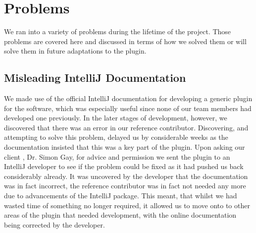 \section{Problems}
We ran into a variety of problems during the lifetime of the project. Those problems are covered here and discussed in terms of how we solved them or will solve them in future adaptations to the plugin. 

\subsection {Misleading IntelliJ Documentation}
We made use of the official IntelliJ documentation for developing a generic plugin for the software, which was especially useful since none of our team members had developed one previously. In the later stages of development, however, we discovered that there was an error in our reference contributor. Discovering, and attempting to solve this problem, delayed us by considerable weeks as the documentation insisted that this was a key part of the plugin. Upon asking our client , Dr. Simon Gay, for advice and permission we sent the plugin to an IntelliJ developer to see if the problem could be fixed as it had pushed us back considerably already. It was uncovered by the developer that the documentation was in fact incorrect, the reference contributor was in fact not needed any more due to advancements of the IntelliJ package. This meant, that whilst we had wasted time of something no longer required, it allowed us to move onto to other areas of the plugin that needed development, with the online documentation being corrected by the developer. 

